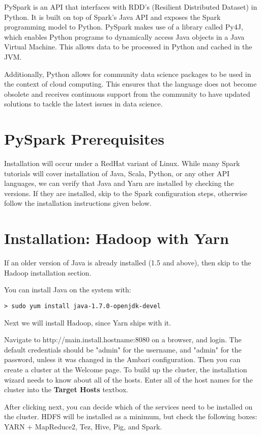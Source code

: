 \documentclass[9pt,twocolumn,twoside]{idsi}
\begin{document}
PySpark is an API that interfaces with RDD's (Resilient Distributed Dataset) in Python. It is built on top of Spark's Java API and exposes the Spark programming model to Python. PySpark makes use of a library called Py4J, which enables Python programs to dynamically access Java objects in a Java Virtual Machine. This allows data to be processed in Python and cached in the JVM.

Additionally, Python allows for community data science packages to be used in the context of cloud computing. This ensures that the language does not become obsolete and receives continuous support from the community to have updated solutions to tackle the latest issues in data science.

\section{PySpark Prerequisites}

Installation will occur under a RedHat variant of Linux. While many Spark tutorials will cover installation of Java, Scala, Python, or any other API languages, we can verify that Java and Yarn are installed by checking the versions. If they are installed, skip to the Spark configuration steps, otherwise follow the installation instructions given below.

\section{Installation: Hadoop with Yarn}
If an older version of Java is already installed (1.5 and above), then skip to the Hadoop installation section.

\noindent
You can install Java on the system with:
\begin{verbatim}
> sudo yum install java-1.7.0-openjdk-devel
\end{verbatim}

\noindent
Next we will install Hadoop, since Yarn ships with it. 

Navigate to http://{main.install.hostname}:8080 on a browser, and login. The default credentials should be "admin" for the username, and "admin" for the password, unless it was changed in the Ambari configuration.
Then you can create a cluster at the Welcome page. To build up the cluster, the installation wizard needs to know about all of the hosts. Enter all of the host names for the cluster into the \textbf{Target Hosts} textbox.

After clicking next, you can decide which of the services need to be installed on the cluster. HDFS will be installed as a minimum, but check the following boxes: YARN + MapReduce2, Tez, Hive, Pig, and Spark.
\end{document}

